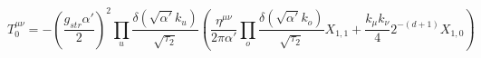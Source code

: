 \begin{equation}\label{eq:nonmod}
T^{\mu\nu}_0=-\left(\frac{g_{str}\alpha'}{2}\right)^2
\prod_u\frac{\delta(\sqrt{\alpha'}k_u)}{\sqrt{\tau_2}}
\left( \frac{\eta^{\mu\nu}}{ 2\pi\alpha'}
\prod_o \frac{\delta(\sqrt{\alpha'}k_o)}{\sqrt{\tau_2}}
X_{1,1}+\frac{k_\mu k_\nu}{ 4} 2^{-(d+1)} X_{1,0}\right)
\end{equation}

